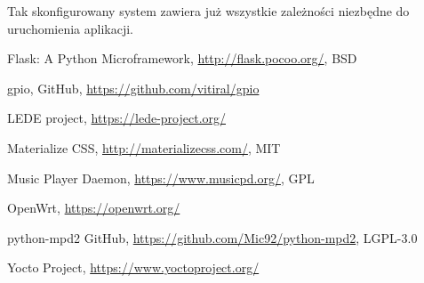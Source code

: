 \documentclass[10pt,a4paper]{article}
\begin{document}
Tak skonfigurowany system zawiera już wszystkie zależności niezbędne do uruchomienia aplikacji.

\begin{thebibliography}{9}

		Flask: A Python Microframework,
		\url{http://flask.pocoo.org/},
		BSD

		gpio,
		GitHub,
		\url{https://github.com/vitiral/gpio}

		LEDE project,
		\url{https://lede-project.org/}

		Materialize CSS,
		\url{http://materializecss.com/},
		MIT

		Music Player Daemon,
		\url{https://www.musicpd.org/},
		GPL

		OpenWrt,
		\url{https://openwrt.org/}
	
		python-mpd2
		GitHub,
		\url{https://github.com/Mic92/python-mpd2},
		LGPL-3.0

		Yocto Project,
		\url{https://www.yoctoproject.org/}

\end{thebibliography}
\end{document}
